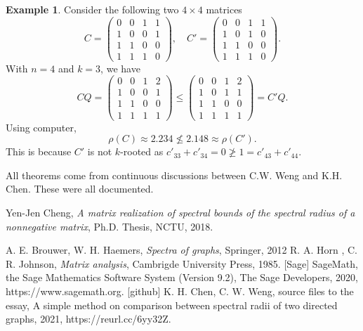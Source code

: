 \documentclass[12pt, a4paper]{article}
\theoremstyle{plain}
\theoremstyle{definition}
\newtheorem{exam}[thm]{Example}
\begin{document}
\begin{exam}
    Consider the following two $4\times 4$ matrices
    $$C=\begin{pmatrix}
    0 & 0 & 1 & 1\\
    1 & 0 & 0 & 1\\
    1 & 1 & 0 & 0\\
    1 & 1 & 1 & 0
    \end{pmatrix},\quad C'=\begin{pmatrix}
    0 & 0 & 1 & 1\\
    1 & 0 & 1 &  0\\
    1 & 1 & 0 & 0\\
    1 & 1 & 1 & 0
    \end{pmatrix}.$$
    With $n=4$ and $k=3$, we have  
    $$CQ=\begin{pmatrix}
    0 & 0 & 1 & 2\\
    1 & 0 & 0 & 1\\
    1 & 1 & 0 & 0\\
    1 & 1 & 1 & 1
    \end{pmatrix}\leq \begin{pmatrix}
    0 & 0 & 1 & 2\\
    1 & 0 & 1 & 1\\
    1 & 1 & 0 & 0\\
    1 & 1 & 1 & 1
    \end{pmatrix}=C'Q.$$
Using computer, \cite[sage]{sage}
    $$\rho(C)\approx 2.234\not\leq 2.148\approx \rho(C').$$
    This is because $C'$ is not $k$-rooted as $c'_{33}+c'_{34}=0\not\geq 1=c'_{43}+c'_{44}$.

All theorems come from continuous discussions between C.W. Weng and K.H. Chen. These were all documented.\cite{src_files}
    
\end{exam}


\begin{thebibliography}{20}
\normalsize
{}

Yen-Jen Cheng, {\it  A matrix realization of spectral bounds
of the spectral radius of a nonnegative matrix}, Ph.D. Thesis, NCTU, 2018.

A. E. Brouwer, W. H. Haemers, {\it Spectra of graphs}, Springer, 2012
R. A. Horn , C. R. Johnson, {\it Matrix analysis}, Cambrigde University Press, 1985.
[Sage] SageMath, the Sage Mathematics Software System (Version 9.2),
       The Sage Developers, 2020, https://www.sagemath.org.  %
[github] K. H. Chen, C. W. Weng, source files to the essay, A simple method on comparison between spectral radii of two directed graphs,
     2021, https://reurl.cc/6yy32Z. %
    

\end{thebibliography}
\end{document}
